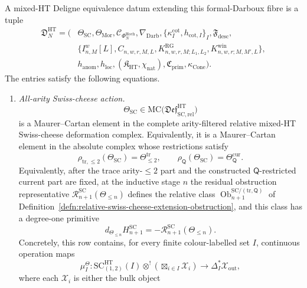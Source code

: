 \begin{defn}
A mixed-HT Deligne equivalence datum extending this formal-Darboux fibre
is a tuple
\[
\begin{aligned}
  \mathfrak D^{\mathrm{HT}}_N
  =
  (&\Theta_{\mathrm{SC}},\Theta_{\mathrm{Mor}},
    \mathcal C_{\Phi_N^{\mathrm{Hoch}}},
    \nabla_{\mathrm{Darb}},\{\kappa^{\mathrm{cot}}_I,h_{\mathrm{cot},I}\}_I,
    \mathfrak F_{\mathrm{desc}},\\
   &\{I^w_{n,M}[L],C_{n,w,r,M,L},
      K^{\mathrm{RG}}_{n,w,r,M;L_1,L_2},
      K^{\mathrm{win}}_{n,w,r;M,M',L}\},\\
   &h_{\mathrm{anom}},h_{\mathrm{loc}},
    (\mathfrak K_{\mathrm{HT}},\chi_{\mathrm{nat}}),
    \mathfrak C_{\mathrm{prim}},
    \kappa_{\operatorname{Cone}}).
\end{aligned}
\]
The entries satisfy the following equations.
\begin{enumerate}[label=\textup{(D\arabic*)}]
	  \item \emph{All-arity Swiss-cheese action.}
	    \[
	      \Theta_{\mathrm{SC}}
	      \in
	      \mathrm{MC}\bigl(
	      \mathfrak{Def}^{\mathrm{HT}}_{\mathrm{SC,rel}}\bigr)
	    \]
	    is a Maurer--Cartan element in the complete arity-filtered relative
	    mixed-HT Swiss-cheese deformation complex.  Equivalently, it is a
	    Maurer--Cartan element in the absolute complex whose restrictions
	    satisfy
	    \[
	      \rho_{\mathrm{tr},\leq2}(\Theta_{\mathrm{SC}})
	      =
	      \Theta^{\mathrm{tr}}_{\le2},
	      \qquad
	      \rho_{\mathsf Q}(\Theta_{\mathrm{SC}})
	      =
	      \Theta_{\mathsf Q}^{\mathrm{cur}} .
		    \]
		    Equivalently, after the trace arity-\(\le2\) part and the
		    constructed \(\mathsf Q\)-restricted current part are fixed, at the
		    inductive stage \(n\) the residual obstruction representative
	    \(\mathcal R^{\mathrm{SC}}_{n+1}(\Theta_{\leq n})\) defines the
	    relative class
	    \(\operatorname{Ob}^{\mathrm{SC}/(\mathrm{tr},\mathsf Q)}_{n+1}\)
	    of
	    Definition~\ref{defn:relative-swiss-cheese-extension-obstruction},
	    and this class has a degree-one primitive
    \[
      d_{\Theta_{\leq n}}H^{\mathrm{SC}}_{n+1}
      =-\mathcal R^{\mathrm{SC}}_{n+1}(\Theta_{\leq n}).
    \]
    Concretely, this row contains, for every finite colour-labelled set
    \(I\), continuous operation maps
      \[
        \mu^{\Theta}_{I}\colon
        \mathrm{SC}^{\mathrm{HT}}_{(1,2)}(I)\otimes^!
      \left(\boxtimes_{i\in I}\mathcal X_i\right)
      \longrightarrow
      \Delta_I^*\mathcal X_{\mathrm{out}},
    \]
    where each \(\mathcal X_i\) is either the bulk object

\end{enumerate}
\end{defn}
